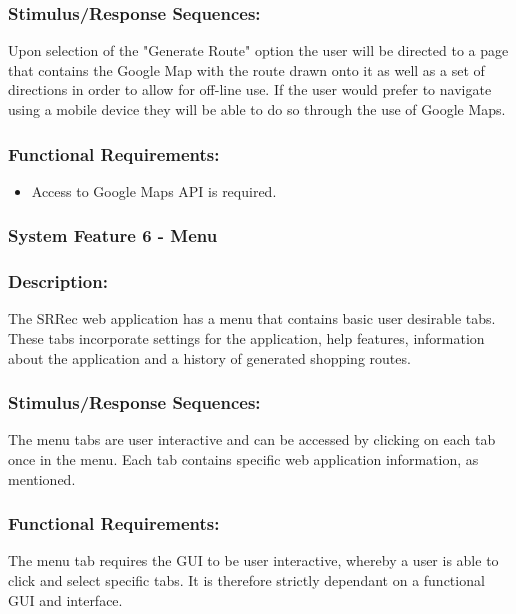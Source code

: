 \documentclass[10pt,twocolumn]{witseiepaper}
\begin{document}
		\subsubsection*{Stimulus/Response Sequences:}
		
		Upon selection of the "Generate Route" option the user will be directed to a page that contains the Google Map with the route drawn onto it as well as a set of directions in order to allow for off-line use. If the user would prefer to navigate using a mobile device they will be able to do so through the use of Google Maps.
		
		\subsubsection*{Functional Requirements:}
		
		\begin{itemize}
			\item Access to Google Maps API is required.
		\end{itemize}
		
		\subsubsection{System Feature 6 - Menu}
		
		\subsubsection*{Description:}
		
		The SRRec web application has a menu that contains basic user desirable tabs. These tabs incorporate settings for the application, help features, information about the application and a history of generated shopping routes. 
		
		\subsubsection*{Stimulus/Response Sequences:}
		
		The menu tabs are user interactive and can be accessed by clicking on each tab once in the menu. Each tab contains specific web application information, as mentioned. 
		
		\subsubsection*{Functional Requirements:}
		
		The menu tab requires the GUI to be user interactive, whereby a user is able to click and select specific tabs. It is therefore strictly dependant on a functional GUI and interface.
		
\end{document}
